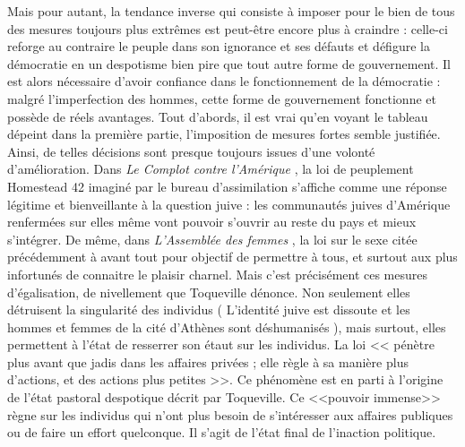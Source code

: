 \documentclass[a4paper]{article}
\newcommand{\adf}{\textit{L'Assemblée des femmes }}
\newcommand{\cca}{\textit{Le Complot contre l'Amérique }}
\begin{document}
	Mais pour autant, la tendance inverse qui consiste à imposer pour le bien de tous des mesures toujours plus extrêmes est peut-être encore plus à craindre : celle-ci reforge au contraire le peuple dans son ignorance et ses défauts et défigure la démocratie en un despotisme bien pire que tout autre forme de gouvernement. Il est alors nécessaire d'avoir confiance dans le fonctionnement de la démocratie : malgré l'imperfection des hommes, cette forme de gouvernement fonctionne et possède de réels avantages. 
	Tout d'abords, il est vrai qu'en voyant le tableau dépeint dans la première partie, l'imposition de mesures fortes semble justifiée. Ainsi, de telles décisions sont presque toujours issues d'une volonté d'amélioration. Dans \cca, la loi de peuplement Homestead 42 imaginé par le bureau d'assimilation s'affiche comme une réponse légitime et bienveillante à la question juive : les communautés juives d'Amérique renfermées sur elles même vont pouvoir s'ouvrir au reste du pays et mieux s'intégrer. De même, dans \adf, la loi sur le sexe citée précédemment à avant tout pour objectif de permettre à tous, et surtout aux plus infortunés de connaitre le plaisir charnel. Mais c'est précisément ces mesures d'égalisation, de nivellement que Toqueville dénonce. Non seulement elles détruisent la singularité des individus ( L'identité juive est dissoute et les hommes et femmes de la cité d'Athènes sont déshumanisés ), mais surtout, elles permettent à l'état de resserrer son étaut sur les individus. La loi << pénètre plus avant que jadis dans les affaires privées ; elle règle à sa manière plus d'actions, et des actions plus petites >>. Ce phénomène est en parti à l'origine de l'état pastoral despotique décrit par Toqueville. Ce <<pouvoir immense>> règne sur les individus qui n'ont plus besoin de s'intéresser aux affaires publiques ou de faire un effort quelconque. Il s'agit de l'état final de l'inaction politique. \\
\end{document}
